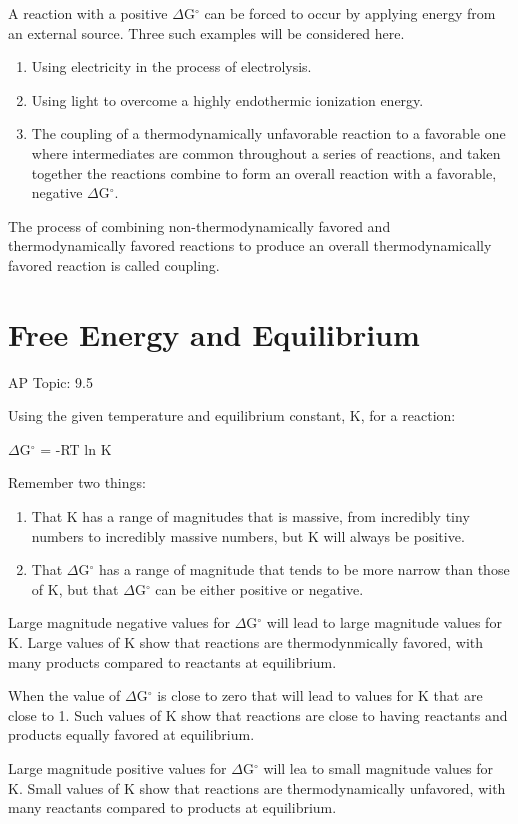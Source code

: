 \documentclass[../chem.tex]{subfiles}
\begin{document}
A reaction with a positive $\Delta$G$^{\circ}$ can be forced to occur by applying energy from an external source. Three such examples will be considered here.
\begin{enumerate}
    \item Using electricity in the process of electrolysis.
    \item Using light to overcome a highly endothermic ionization energy.
    \item The coupling of a thermodynamically unfavorable reaction to a favorable one where intermediates are common throughout a series of reactions, and taken together the reactions combine to form an overall reaction with a favorable, negative $\Delta$G$^{\circ}$.
\end{enumerate}

The process of combining non-thermodynamically favored and thermodynamically favored reactions to produce an overall thermodynamically favored reaction is called coupling.
\section{Free Energy and Equilibrium}
AP Topic: 9.5

Using the given temperature and equilibrium constant, K, for a reaction:
\begin{center}
    $\Delta$G$^{\circ}$ = -RT ln K 
\end{center}
Remember two things:
\begin{enumerate}
    \item That K has a range of magnitudes that is massive, from incredibly tiny numbers to incredibly massive numbers, but K will always be positive.
    \item That $\Delta$G$^{\circ}$ has a range of magnitude that tends to be more narrow than those of K, but that $\Delta$G$^{\circ}$ can be either positive or negative.
\end{enumerate}

Large magnitude negative values for $\Delta$G$^{\circ}$ will lead to large magnitude values for K. Large values of K show that reactions are thermodynmically favored, with many products compared to reactants at equilibrium.

When the value of $\Delta$G$^{\circ}$ is close to zero that will lead to values for K that are close to 1. Such values of K show that reactions are close to having 
reactants and products equally favored at equilibrium.

Large magnitude positive values for $\Delta$G$^{\circ}$ will lea to small magnitude values for K. Small values of K show that reactions are thermodynamically unfavored, with many reactants compared to products at equilibrium.
\end{document}
